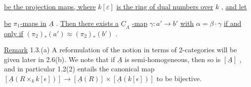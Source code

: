 \begin{center}
\end{center}
\underline{be the projection maps, where}  $k[\varepsilon]$  \underline{is the ring of dual numbers over}  $k$  , \underline{and let}

\begin{center}
\end{center}
\underline{be}  $\pi_1$\underline{-maps in}  $\underline{A}$  . \underline{Then there exists a}  $\underline{C}_{\Lambda}$  \underline{-map}  $\gamma : a' \longrightarrow b'$  \underline{with}  $\alpha = \beta\cdot\gamma$ \underline{if and only if}  $(\pi_2)_{*}(a') \approx (\pi_2)_{*}(b')$  .

\underline{Remark} 1.3.(a)  A reformulation of the notion in terms of  2-categories will be given later in 2.6(b). We note that if  $\underline{A}$  is semi-homogeneous, then so is  $[\underline{A}]$  , and in particular 1.2(2) entails the canonical map
$[\underline{A}(R \times_{k} k[\epsilon])] \longrightarrow [\underline{A}(R)] \times [\underline{A}(k[\epsilon])]$
to be bijective.

